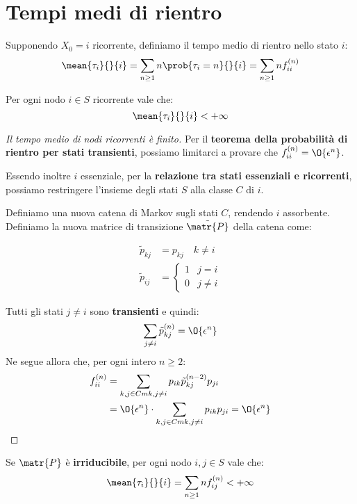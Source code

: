 \documentclass[\main/main.tex]{subfiles}
\begin{document}
\section{Tempi medi di rientro}
\begin{definition}
  Supponendo \(X_0 = i\) ricorrente, definiamo il tempo medio di rientro nello stato \(i\):
  \[
    \mean{\tau_i}{}{i} = \sum_{n \geq 1} n \prob{\tau_i = n}{}{i} = \sum_{n \geq 1} n f^{(n)}_{ii}
  \]
\end{definition}

\begin{theorem}
  Per ogni nodo \(i \in S\) ricorrente vale che:
  \[
    \mean{\tau_i}{}{i} < + \infty
  \]
\end{theorem}

\begin{proof}[Il tempo medio di nodi ricorrenti è finito]
  Per il \textbf{teorema della probabilità di rientro per stati transienti}, possiamo limitarci a provare che \(f^{(n)}_{ii} = \O{\epsilon^n}\).

  Essendo inoltre \(i\) essenziale, per la \textbf{relazione tra stati essenziali e ricorrenti}, possiamo restringere l'insieme degli stati \(S\) alla classe \(C\) di \(i\).

  Definiamo una nuova catena di Markov sugli stati \(C\), rendendo \(i\) assorbente. Definiamo la nuova matrice di transizione \(\tilde{\matr{P}}\) della catena come:

  \begin{align*}
    \tilde{p}_{kj} & = p_{kj} \quad k \neq i     \\
    \tilde{p}_{ij} & = \begin{cases}
      1 & j = i    \\
      0 & j \neq i
    \end{cases}
  \end{align*}

  Tutti gli stati \(j \neq i\) sono \textbf{transienti} e quindi:
  \[
    \sum_{j \neq i} \tilde{p}^{(n)}_{kj} = \O{\epsilon^n}
  \]
  Ne segue allora che, per ogni intero \(n\geq 2\):
  \begin{align*}
    f^{(n)}_{ii} & = \sum_{k, j \in Cm k, j \neq i} p_{ik} \tilde{p}^{(n-2)}_{kj}p_{ji}                 \\
                 & = \O{\epsilon^n} \cdot \sum_{k, j \in Cm k, j \neq i} p_{ik} p_{ji} = \O{\epsilon^n} \\
  \end{align*}
\end{proof}

\begin{theorem}
  Se \(\matr{P}\) è \textbf{irriducibile}, per ogni nodo \(i, j \in S\) vale che:
  \[
    \mean{\tau_i}{}{i} = \sum_{n \geq 1} n f^{(n)}_{ij} < + \infty
  \]
\end{theorem}
\end{document}
